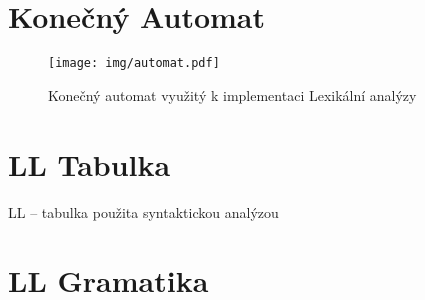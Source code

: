 \documentclass[a4paper, 11pt]{article}
\begin{document}
\newpage
\appendix

\section{Konečný Automat}

		\begin{figure}[!ht]
		\centering
		\texttt{[image: img/automat.pdf]}
		\caption{Konečný automat využitý k implementaci Lexikální analýzy}
		\label{figure:automat}
	\end{figure}


\section{LL Tabulka}

 	\begin{table}[!ht]
	\centering
	 \caption{LL -- tabulka použita syntaktickou analýzou}
		\label{table:ll_table}
	\end{table}
 
	
 \section{LL Gramatika}
 
\end{document}
